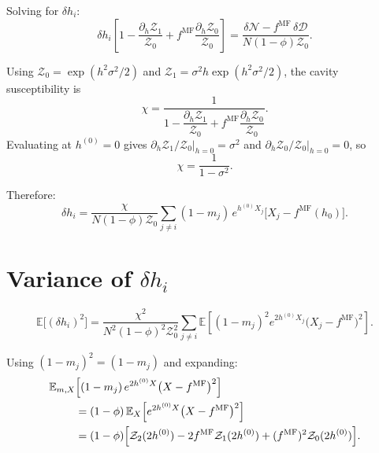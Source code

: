 \documentclass[aps,prb,onecolumn,showpacs,preprintnumbers,amsmath,amssymb]{revtex4-2}
\newcommand{\fMF}{f^{\mathrm{MF}}}
\begin{document}
Solving for $\delta h_i$:
\begin{equation}
    \delta h_i\!\left[1 - \frac{\partial_h\mathcal{Z}_1}{\mathcal{Z}_0}
                           + \fMF\frac{\partial_h\mathcal{Z}_0}{\mathcal{Z}_0}\right]
    = \frac{\delta\mathcal{N} - \fMF\,\delta\mathcal{D}}{N(1-\phi)\mathcal{Z}_0}.
\end{equation}

Using $\mathcal{Z}_0 = \exp(h^2\sigma^2/2)$ and $\mathcal{Z}_1 = \sigma^2 h\exp(h^2\sigma^2/2)$, the cavity susceptibility is
\begin{equation}
    \chi = \frac{1}{1 - \dfrac{\partial_h\mathcal{Z}_1}{\mathcal{Z}_0}
                  + \fMF\dfrac{\partial_h\mathcal{Z}_0}{\mathcal{Z}_0}}.
\end{equation}
Evaluating at $h^{(0)}=0$ gives $\partial_h\mathcal{Z}_1/\mathcal{Z}_0\big|_{h=0} = \sigma^2$
and $\partial_h\mathcal{Z}_0/\mathcal{Z}_0\big|_{h=0} = 0$, so
\begin{equation}
    \chi = \frac{1}{1-\sigma^2}.
\end{equation}

Therefore:
\begin{equation}
    \delta h_i = \frac{\chi}{N(1-\phi)\mathcal{Z}_0}
                 \sum_{j\neq i}(1-m_j)\,e^{h^{(0)}X_j}\bigl[X_j - \fMF(h_0)\bigr].
\end{equation}

\section{Variance of \texorpdfstring{$\delta h_i$}{delta h\_i}}

\begin{equation}
    \mathbb{E}\!\bigl[(\delta h_i)^2\bigr]
    = \frac{\chi^2}{N^2(1-\phi)^2\mathcal{Z}_0^2}
      \sum_{j\neq i}\mathbb{E}\!\left[(1-m_j)^2 e^{2h^{(0)}X_j}
      \bigl(X_j - \fMF\bigr)^2\right].
\end{equation}

Using $(1-m_j)^2=(1-m_j)$ and expanding:
\begin{align}
    \mathbb{E}_{m,X}&\!\left[(1-m_j)\,e^{2h^{(0)}X}\bigl(X-\fMF\bigr)^2\right] \nonumber\\
    &= (1-\phi)\,\mathbb{E}_X\!\left[e^{2h^{(0)}X}\bigl(X-\fMF\bigr)^2\right] \nonumber\\
    &= (1-\phi)\Bigl[\mathcal{Z}_2(2h^{(0)}) - 2\fMF\mathcal{Z}_1(2h^{(0)}) + (\fMF)^2\mathcal{Z}_0(2h^{(0)})\Bigr].
\end{align}
\end{document}
